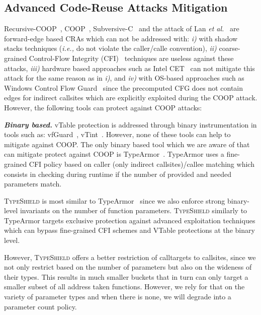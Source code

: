 \subsection{Advanced Code-Reuse Attacks Mitigation}
\label{Mitigation of Advanced Code-Reuse Attacks}
Recursive-COOP~\cite{crane:readactor++}, COOP~\cite{schuster:coop}, Subversive-C~\cite{subversive-c:lettner} and the attack of Lan \textit{et al.}~\cite{loop:oriented}
are forward-edge based CRAs which can not be addressed with:
\textit{i)}  with shadow stacks techniques (\textit{i.e.,} do not violate the caller/calle convention), 
\textit{ii)} coarse-grained Control-Flow Integrity (CFI)~\cite{abadi:cfi2, abadi:cfi} techniques are useless against these attacks, 
\textit{iii)} hardware based approaches such as Intel CET~\cite{intel:cet} can not mitigate this attack for the same reason as in \textit{i)}, and 
\textit{iv)} with OS-based approaches such as Windows Control Flow Guard~\cite{windows:cfguard} 
since the precomputed CFG does not contain edges for indirect callsites which are explicitly exploited during the COOP attack.
However, the following tools can protect against COOP attacks:

\textbf{\textit{Binary based.}} vTable protection is addressed through binary instrumentation in tools
such as: vfGuard~\cite{vfuard:aravind}, vTint~\cite{vtint:zhang}. However, none of these tools can
help to mitigate against COOP. The only binary based tool which we are aware of that
can mitigate protect against COOP is TypeArmor~\cite{veen:typearmor}.  
TypeArmor uses a fine-grained CFI policy based on caller (only indirect callsites)/callee matching 
which consists in checking during runtime if the number of provided and needed parameters match.

\textsc{TypeShield} is most similar to TypeArmor~\cite{veen:typearmor} since
we also enforce strong binary-level invariants on the number of function
parameters. \textsc{TypeShield} similarly to TypeArmor targets 
exclusive protection against advanced exploitation techniques 
which can bypass fine-grained CFI schemes and VTable protections at the binary level.

However, \textsc{TypeShield} offers a better restriction of calltargets to callsites, since 
we not only restrict based on the number of parameters but also on the wideness of their types. 
This results in much smaller buckets that in turn can only target a smaller subset of all address
taken functions. However, we rely for that on the variety of parameter types and when there is 
none, we will degrade into a parameter count policy.

